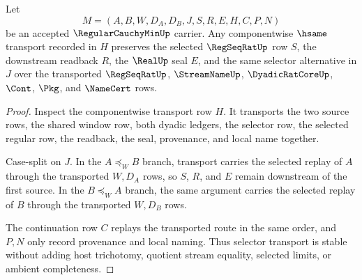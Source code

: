 \begin{theorem}
\label{thm:regular-cauchy-min-selector-transport-stability}
Let
$$
M=(A,B,W,D_A,D_B,J,S,R,E,H,C,P,N)
$$
be an accepted $\RegularCauchyMinUp$ carrier. Any componentwise $\hsame$ transport recorded in $H$ preserves the selected $\RegSeqRatUp$ row $S$, the downstream readback $R$, the $\RealUp$ seal $E$, and the same selector alternative in $J$ over the transported $\RegSeqRatUp$, $\StreamNameUp$, $\DyadicRatCoreUp$, $\Cont$, $\Pkg$, and $\NameCert$ rows.
\end{theorem}
\begin{proof}
Inspect the componentwise transport row $H$. It transports the two source rows, the shared window row, both dyadic ledgers, the selector row, the selected regular row, the readback, the seal, provenance, and local name together.

Case-split on $J$. In the $A \preceq_W B$ branch, transport carries the selected replay of $A$ through the transported $W,D_A$ rows, so $S$, $R$, and $E$ remain downstream of the first source. In the $B \preceq_W A$ branch, the same argument carries the selected replay of $B$ through the transported $W,D_B$ rows.

The continuation row $C$ replays the transported route in the same order, and $P,N$ only record provenance and local naming. Thus selector transport is stable without adding host trichotomy, quotient stream equality, selected limits, or ambient completeness.
\end{proof}

